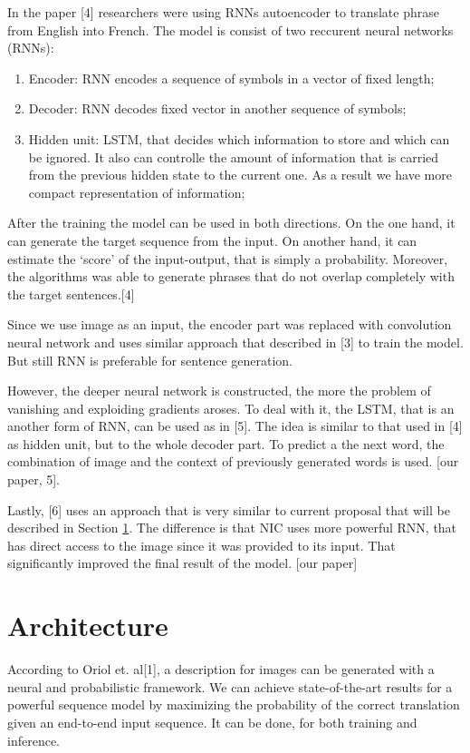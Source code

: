 \documentclass[a4paper,UKenglish,cleveref, autoref, thm-restate]{lipics-v2021}
\begin{document}
In the paper [4] researchers were using RNNs autoencoder to translate phrase from English into French. The model is consist of two reccurent neural networks (RNNs):
 \begin{enumerate}
 \item Encoder: RNN encodes a sequence of symbols in a vector of fixed length;
 \item Decoder: RNN decodes fixed vector in another sequence of symbols;
 \item Hidden unit: LSTM, that decides which information to store and which can be ignored. It also can controlle the amount of information that is carried from the previous hidden state to the current one. As a result we have more compact representation of information;
 \end{enumerate}
After the training the model can be used in both directions. On the one hand, it can generate the target sequence from the input. On another hand, it can estimate the ‘score’ of the input-output, that is simply a probability. Moreover, the algorithms was able to generate phrases that do not overlap completely with the target sentences.[4]

Since we use image as an input, the encoder part was replaced with convolution neural network and uses similar approach that described in [3] to train the model. But still RNN is preferable for sentence generation.

However, the deeper neural network is constructed, the more the problem of vanishing and exploiding gradients aroses. To deal with it, the LSTM, that is an another form of RNN, can be used as in [5]. The idea is similar to that used in [4] as hidden unit, but to the whole decoder part. To predict a the next word, the combination of image and the context of previously generated words is used. [our paper, 5].

Lastly, [6] uses an approach that is very similar to current proposal that will be described in Section \ref{Architecture}. The difference is that NIC uses more powerful RNN, that has direct access to the image since it was provided to its input. That significantly improved the final result of the model. [our paper]

\section{Architecture}
\label{Architecture}

According to Oriol et. al[1], a description for images can be generated with a neural and probabilistic framework. We can achieve state-of-the-art results for a powerful sequence model by maximizing the probability of the correct translation given an end-to-end input sequence. It can be done, for both training and inference.
\end{document}
